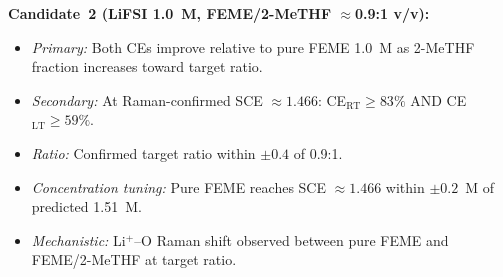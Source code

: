 \documentclass[11pt]{article}
\theoremstyle{plain}
\theoremstyle{definition}
\theoremstyle{remark}
\begin{document}
\noindent\textbf{Candidate~2 (LiFSI 1.0~M, FEME/2-MeTHF
$\approx$0.9:1 v/v):}
\begin{itemize}[leftmargin=2em]
  \item \textit{Primary:} Both CEs improve relative to pure FEME
        1.0~M as 2-MeTHF fraction increases toward target ratio.
  \item \textit{Secondary:} At Raman-confirmed SCE $\approx 1.466$:
        CE$_\mathrm{RT} \geq 83\%$ AND CE$_\mathrm{LT} \geq 59\%$.
  \item \textit{Ratio:} Confirmed target ratio within $\pm 0.4$ of
        0.9:1.
  \item \textit{Concentration tuning:} Pure FEME reaches SCE
        $\approx 1.466$ within $\pm 0.2$~M of predicted 1.51~M.
  \item \textit{Mechanistic:} Li$^+$--O Raman shift observed
        between pure FEME and FEME/2-MeTHF at target ratio.
\end{itemize}
\end{document}
